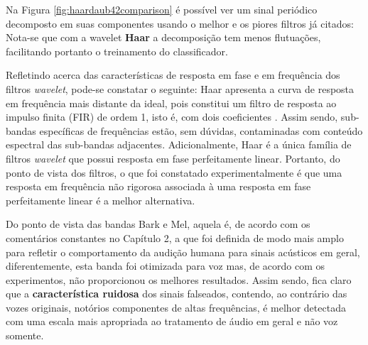 	\par Na Figura \ref{fig:haardaub42comparison} é possível ver um sinal periódico decomposto em suas componentes usando o melhor e os piores filtros já citados: Nota-se que com a wavelet \textbf{Haar} a decomposição tem menos flutuações, facilitando portanto o treinamento do classificador.\\
		
	\par Refletindo acerca das características de resposta em fase e em frequência dos filtros \textit{wavelet}, pode-se constatar o seguinte: Haar apresenta a curva de resposta em frequência mais distante da ideal, pois constitui um filtro de resposta ao impulso finita (FIR) de ordem 1, isto é, com dois coeficientes \cite{WaveletPropertiesBrowser}. Assim sendo, sub-bandas específicas de frequências estão, sem dúvidas, contaminadas com conteúdo espectral das sub-bandas adjacentes. Adicionalmente, Haar é a única família de filtros \textit{wavelet} que possui resposta em fase perfeitamente linear. Portanto, do ponto de vista dos filtros, o que foi constatado experimentalmente é que uma resposta em frequência não rigorosa associada à uma resposta em fase perfeitamente linear é a melhor alternativa.\\
	
	\par Do ponto de vista das bandas Bark e Mel, aquela é, de acordo com os comentários constantes no Capítulo 2, a que foi definida de modo mais amplo para refletir o comportamento da audição humana para sinais acústicos em geral, diferentemente, esta banda foi otimizada para voz mas, de acordo com os experimentos, não proporcionou os melhores resultados. Assim sendo, fica claro que a \textbf{característica ruidosa} dos sinais falseados, contendo, ao contrário das vozes originais, notórios componentes de altas frequências, é melhor detectada com uma escala mais apropriada ao tratamento de áudio em geral e não voz somente.\\
	
